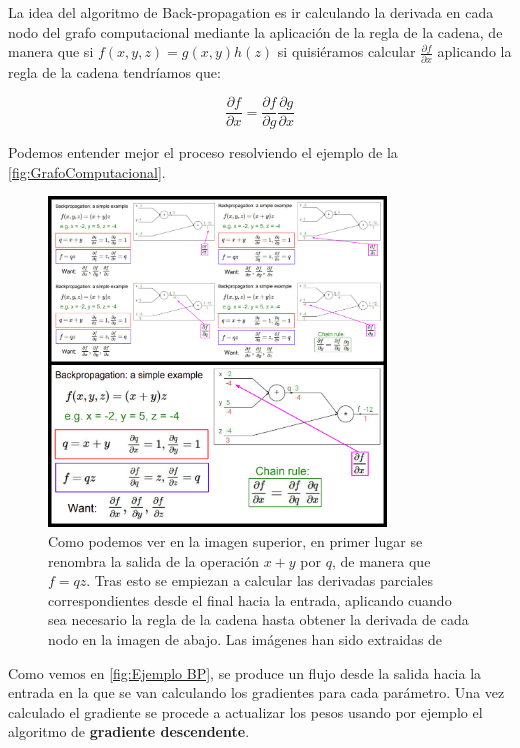         \medskip

        \noindent La idea del algoritmo de Back-propagation es ir calculando la derivada en cada nodo del grafo computacional mediante la aplicación de la regla de la cadena, de manera que si $f(x,y,z)=g(x,y)h(z)$ si quisiéramos calcular $\frac{\partial f}{\partial x}$ aplicando la regla de la cadena tendríamos que: 

        \begin{equation}
            \frac{\partial f}{\partial x}= \frac{\partial f}{\partial g} \frac{\partial g}{\partial x}
        \end{equation}

        
        \noindent Podemos entender mejor el proceso resolviendo el ejemplo de la \autoref{fig:GrafoComputacional}.

        \begin{figure}[!h]
            \centering
            \includegraphics[width=0.8\textwidth]{img/BP_ejemplo.png}
            \caption{Como podemos ver en la imagen superior, en primer lugar se renombra la salida de la operación $x+y$ por $q$, de manera que $f=qz$. Tras esto se empiezan a calcular las derivadas parciales correspondientes desde el final hacia la entrada, aplicando cuando sea necesario la regla de la cadena hasta obtener la derivada de cada nodo en la imagen de abajo. Las imágenes han sido extraidas de \cite{StanfordCourse}}
            \label{fig:Ejemplo BP}
        \end{figure}

        \noindent Como vemos en \autoref{fig:Ejemplo BP}, se produce un flujo desde la salida hacia la entrada en la que se van calculando los gradientes para cada parámetro. Una vez calculado el gradiente se procede a actualizar los pesos usando por ejemplo el algoritmo de \textbf{gradiente descendente}.
    
